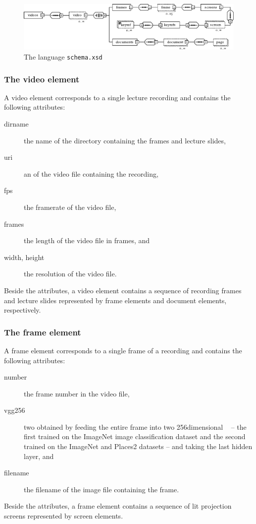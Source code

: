 \begin{figure}
  \leavevmode{}\textwidth
  \includegraphics[width=1.4\textwidth]{fig/structure/schema}
  \caption{The  language \texttt{schema.xsd} }
  \label{fig:schema}
\end{figure}

\subsubsection*{The video element}
A video element corresponds to a single lecture recording and contains the
following attributes:
\begin{description}
  \item[dirname] the name of the directory containing the frames and lecture slides,
  \item[uri] an  of the video file containing the recording,
  \item[fps] the framerate of the video file,
  \item[frames] the length of the video file in frames, and
  \item[width\textmd, height] the resolution of the video file.
\end{description}
Beside the attributes, a video element contains a sequence of recording frames
and lecture slides represented by frame elements and document elements,
respectively.

\subsubsection*{The frame element}
A frame element corresponds to a single frame of a recording and contains the
following attributes:
\begin{description}
  \item[number] the frame number in the video file,
  \item[vgg256] two  obtained by feeding the
    entire frame into two 256dimensional ~\cite{simonyan2014very} -- the first trained on the ImageNet%
     image
    classification dataset and the second trained on the ImageNet and
    Places2
    datasets -- and taking the last hidden layer, and
  \item[filename] the filename of the image file containing the frame.
\end{description}
Beside the attributes, a frame element contains a sequence of lit projection
screens represented by screen elements.

